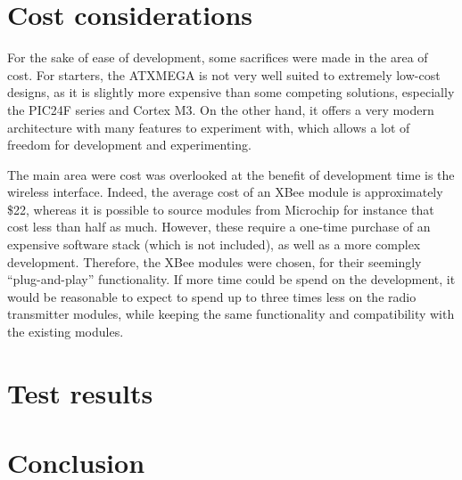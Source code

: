 \section{Cost considerations}

For the sake of ease of development, some sacrifices were made in the area of
cost. For starters, the ATXMEGA is not very well suited to extremely low-cost
designs, as it is slightly more expensive than some competing solutions,
especially the PIC24F series and Cortex M3. On the other hand, it offers a very
modern architecture with many features to experiment with, which allows a lot of
freedom for development and experimenting.


The main area were cost was overlooked at the benefit of development time
is the wireless interface. Indeed, the average cost of an XBee module is
approximately \$22, whereas it is possible to source modules from Microchip for
instance that cost less than half as much. However, these require a one-time
purchase of an expensive software stack (which is not included), as well as a
more complex development. Therefore, the XBee modules were chosen, for their
seemingly ``plug-and-play'' functionality. If more time could be spend on the
development, it would be reasonable to expect to spend up to three times less on
the radio transmitter modules, while keeping the same functionality and
compatibility with the existing modules.


\section{Test results}


\section{Conclusion}


\pagebreak



\pagebreak
\appendix

